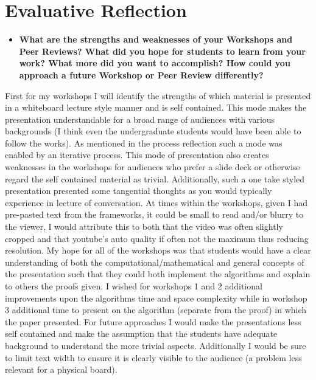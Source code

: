 \documentclass[12pt]{article}
\begin{document}
\section{Evaluative Reflection}
\begin{itemize}
    \item \textbf{What are the strengths and weaknesses of your Workshops and Peer Reviews? What did you hope for students to learn from your work? What more did you want to accomplish? How could you approach a future Workshop or Peer Review differently?}
\end{itemize}

First for my workshops I will identify the strengths of which material is presented in a whiteboard lecture style manner and is self contained. This mode makes the presentation understandable for a broad range of audiences with various backgrounds (I think even the undergraduate students would have been able to follow the works). As mentioned in the process reflection such a mode was enabled by an iterative process. This mode of presentation also creates weaknesses in the workshops for audiences who prefer a slide deck or otherwise regard the self contained material as trivial. Additionally, such a one take styled presentation presented some tangential thoughts as you would typically experience in lecture of conversation. At times within the workshops, given I had pre-pasted text from the frameworks, it could be small to read and/or blurry to the viewer, I would attribute this to both that the video was often slightly cropped and that youtube's auto quality if often not the maximum thus reducing resolution. My hope for all of the workshops was that students would have a clear understanding of both the computational/mathematical and general concepts of the presentation such that they could both implement the algorithms and explain to others the proofs given. I wished for workshops 1 and 2 additional improvements upon the algorithms time and space complexity while in workshop 3 additional time to present on the algorithm (separate from the proof) in which the paper presented. For future approaches I would make the presentations less self contained and make the assumption that the students have adequate background to understand the more trivial aspects. Additionally I would be sure to limit text width to ensure it is clearly visible to the audience (a problem less relevant for a physical board).
\end{document}
